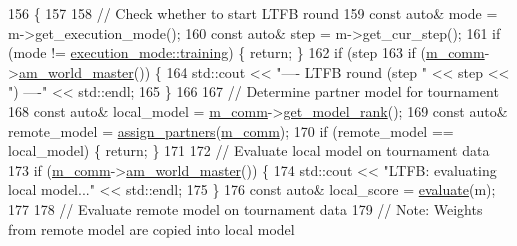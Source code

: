 \begin{DoxyCode}
156                                                  \{
157 
158   \textcolor{comment}{// Check whether to start LTFB round}
159   \textcolor{keyword}{const} \textcolor{keyword}{auto}& mode = m->get\_execution\_mode();
160   \textcolor{keyword}{const} \textcolor{keyword}{auto}& step = m->get\_cur\_step();
161   \textcolor{keywordflow}{if} (mode != \hyperlink{base_8hpp_a2781a159088df64ed7d47cc91c4dc0a8ac185ddac8b5a8f5aa23c5b80bc12d214}{execution\_mode::training}) \{ \textcolor{keywordflow}{return}; \}
162   \textcolor{keywordflow}{if} (step %
163   \textcolor{keywordflow}{if} (\hyperlink{classlbann_1_1lbann__callback__ltfb_a7536bb519c8a89b518a3196f953ac048}{m\_comm}->\hyperlink{classlbann_1_1lbann__comm_a1ef526486183a29feadca9bef096a534}{am\_world\_master}()) \{
164     std::cout << \textcolor{stringliteral}{"---- LTFB round (step "} << step << \textcolor{stringliteral}{") ----"} << std::endl;
165   \}
166 
167   \textcolor{comment}{// Determine partner model for tournament}
168   \textcolor{keyword}{const} \textcolor{keyword}{auto}& local\_model = \hyperlink{classlbann_1_1lbann__callback__ltfb_a7536bb519c8a89b518a3196f953ac048}{m\_comm}->\hyperlink{classlbann_1_1lbann__comm_a6422f70c92bed0b78179facc52b066f7}{get\_model\_rank}();
169   \textcolor{keyword}{const} \textcolor{keyword}{auto}& remote\_model = \hyperlink{namespacelbann_1_1anonymous__namespace_02callback__ltfb_8cpp_03_a1865e25ff1f3b6ad417d1853ea0bc6f4}{assign\_partners}(\hyperlink{classlbann_1_1lbann__callback__ltfb_a7536bb519c8a89b518a3196f953ac048}{m\_comm});
170   \textcolor{keywordflow}{if} (remote\_model == local\_model) \{ \textcolor{keywordflow}{return}; \}
171 
172   \textcolor{comment}{// Evaluate local model on tournament data}
173   \textcolor{keywordflow}{if} (\hyperlink{classlbann_1_1lbann__callback__ltfb_a7536bb519c8a89b518a3196f953ac048}{m\_comm}->\hyperlink{classlbann_1_1lbann__comm_a1ef526486183a29feadca9bef096a534}{am\_world\_master}()) \{
174     std::cout << \textcolor{stringliteral}{"LTFB: evaluating local model..."} << std::endl;
175   \}
176   \textcolor{keyword}{const} \textcolor{keyword}{auto}& local\_score = \hyperlink{namespacelbann_1_1anonymous__namespace_02callback__ltfb_8cpp_03_a2525bf058156612d7847d0754277e4fc}{evaluate}(m);
177 
178   \textcolor{comment}{// Evaluate remote model on tournament data}
179   \textcolor{comment}{// Note: Weights from remote model are copied into local model}

\end{DoxyCode}

